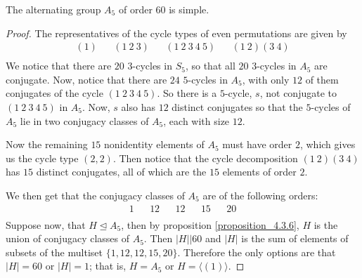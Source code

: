 \begin{theorem}\label{theorem_4.3.7}
  The alternating group $A_5$ of order $60$ is simple.
\end{theorem}
\begin{proof}
  The representatives of the cycle types of even permutations are given by
  \begin{align*}
    (1) && (1 \ 2 \ 3) && (1 \ 2 \ 3 \ 4 \ 5) && (1 \ 2)(3 \ 4)     \\
  \end{align*}
  We notice that there are $20$  $3$-cycles in $S_5$, so that all $20$
  $3$-cycles in  $A_5$ are conjugate. Now, notice that there are $24$
  $5$-cycles in $A_5$, with only $12$ of them conjugates of the cycle  $(1 \ 2
  \ 3 \ 4 \ 5)$. So there is a $5$-cycle, $s$, not conjugate to $(1 \ 2 \ 3 \
  4 \ 5)$ in $A_5$. Now, $s$ also has  $12$ distinct conjugates so that the
  $5$-cycles of  $A_5$ lie in two conjugacy classes of  $A_5$, each with size
  $12$.

  Now the remaining $15$ nonidentity elements of  $A_5$ must have order $2$,
  which gives us the cycle type  $(2,2)$. Then notice that the cycle
  decomposition $(1 \ 2)(3 \ 4)$ has $15$ distinct conjugates, all of which
  are the  $15$ elements of order  $2$.

  We then get that the conjugacy classes of  $A_5$ are of the following
  orders:
  \begin{align*}
    1  &&  12  &&  12  &&  15  &&  20  \\
  \end{align*}
  Suppose now, that $H \unlhd A_5$, then by proposition \ref{proposition_4.3.6}, $H$ is the
  union of conjugacy classes of  $A_5$. Then $|H||60$ and $|H|$ is
  the sum of elements of subsets of the multiset $\{1, 12, 12, 15, 20\}$.
  Therefore the only options are that $|H|=60$ or $|H|=1$; that is,
  $H=A_5$ or $H=\langle (1) \rangle$.
\end{proof}
